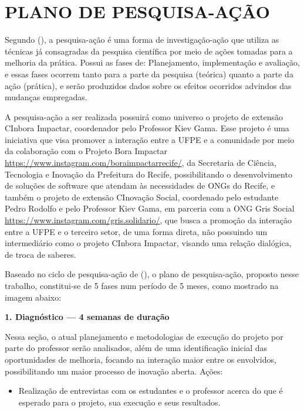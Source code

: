 \section{PLANO DE PESQUISA-AÇÃO}
\label{pesquisaacao}

Segundo \citeauthor{tripp2005} (\citeyear{tripp2005}), a pesquisa-ação é uma forma de investigação-ação que utiliza as técnicas já consagradas da pesquisa científica por meio de ações tomadas para a melhoria da prática. Possui as fases de: Planejamento, implementação e avaliação, e essas fases ocorrem tanto para a parte da pesquisa (teórica) quanto a parte da ação (prática), e serão produzidos dados sobre os efeitos ocorridos advindos das mudanças empregadas.

A pesquisa-ação a ser realizada possuirá como universo o projeto de extensão CInbora Impactar, coordenador pelo Professor Kiev Gama. Esse projeto é uma iniciativa que visa promover a interação entre a \gls{UFPE} e a comunidade por meio da colaboração com o Projeto Bora Impactar \url{https://www.instagram.com/boraimpactarrecife/}, da Secretaria de Ciência, Tecnologia e Inovação da Prefeitura do Recife, possibilitando o desenvolvimento de soluções de software que atendam às necessidades de \gls{ONG}s do Recife, e também o projeto de extensão CInovação Social, coordenado pelo estudante Pedro Rodolfo e pelo Professor Kiev Gama, em parceria com a ONG Gris Social \url{https://www.instagram.com/gris.solidario/}, que busca a promoção da interação entre a \gls{UFPE} e o terceiro setor, de uma forma direta, não possuindo um intermediário como o projeto CInbora Impactar, visando uma relação dialógica, de troca de saberes.

\par\vspace{1\baselineskip}



Baseado no ciclo de pesquisa-ação de \citeauthor{staron2020} (\citeyear{staron2020}), o plano de pesquisa-ação, proposto nesse trabalho, constitui-se de 5 fases num período de 5 meses, como mostrado na imagem abaixo:




\textbf{1. Diagnóstico — 4 semanas de duração}

Nessa seção, o atual planejamento e metodologias de execução do projeto por parte do professor serão analisados, além de uma identificação inicial das oportunidades de melhoria, focando na interação maior entre os envolvidos, possibilitando um maior processo de inovação aberta. 
Ações: 
\begin{itemize}
\item Realização de entrevistas com os estudantes e o professor acerca do que é esperado para o projeto, sua execução e seus resultados. 
\par\vspace{1\baselineskip}

\end{itemize}

